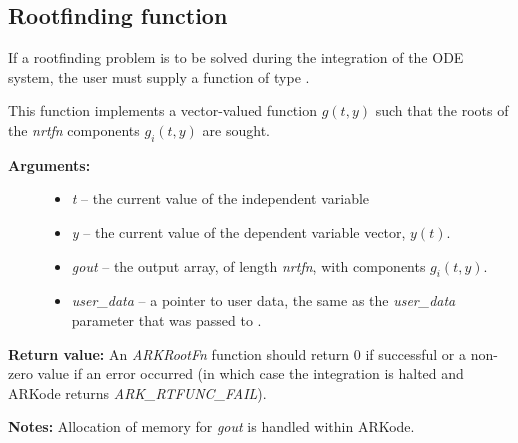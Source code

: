 \documentclass[letterpaper,10pt,english]{sphinxmanual}
\begin{document}
\subsection{Rootfinding function}
\label{c_interface/User_supplied:cinterface-rootfindingfn}\label{c_interface/User_supplied:rootfinding-function}
If a rootfinding problem is to be solved during the integration of the
ODE system, the user must supply a function of type {\hyperref[c_interface/User_supplied:c.ARKRootFn]{\emph{}}}.

\begin{fulllineitems}
\label{c_interface/User_supplied:c.ARKRootFn}
This function implements a vector-valued function
\(g(t,y)\) such that the roots of the \emph{nrtfn} components
\(g_i(t,y)\) are sought.
\begin{description}
\item[{\textbf{Arguments:}}] \leavevmode\begin{itemize}
\item {} 
\emph{t} -- the current value of the independent variable

\item {} 
\emph{y} -- the current value of the dependent variable vector, \(y(t)\).

\item {} 
\emph{gout} -- the output array, of length \emph{nrtfn}, with components \(g_i(t,y)\).

\item {} 
\emph{user\_data} -- a pointer to user data, the same as the
\emph{user\_data} parameter that was passed to {\hyperref[c_interface/User_callable:c.ARKodeSetUserData]{\emph{}}}.

\end{itemize}

\end{description}

\textbf{Return value:}
An \emph{ARKRootFn} function should return 0 if successful
or a non-zero value if an error occurred (in which case the
integration is halted and ARKode returns \emph{ARK\_RTFUNC\_FAIL}).

\textbf{Notes:} Allocation of memory for \emph{gout} is handled within ARKode.

\end{fulllineitems}
\end{document}
